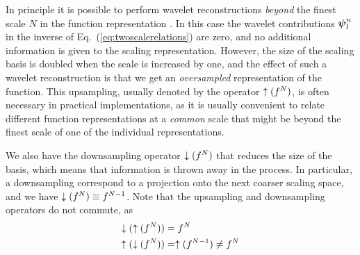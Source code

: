 In principle it is possible to perform wavelet reconstructions \emph{beyond} the
finest scale $N$ in the function representation . In this case
the wavelet contributions $\boldsymbol{\psi}_l^n$ in the inverse of 
Eq.~(\ref{eq:twoscalerelations}) are zero, and no additional information is
given to the scaling representation. However, the size of the scaling basis is 
doubled when the scale is increased by one, and the effect of such a wavelet 
reconstruction is that we get an \emph{oversampled} representation of the 
function. This upsampling, usually denoted by the operator 
$\uparrow({f}^{N})$, is often necessary in practical implementations, 
as it is usually convenient to relate different function representations at a 
\emph{common} scale that might be beyond the finest scale of one of the individual 
representations.

We also have the downsampling operator $\downarrow({f}^{N})$ that reduces
the size of the basis, which means that information is thrown away in the process.
In particular, a downsampling correspond to a projection onto the next coarser
scaling space, and we have $\downarrow({f}^{N}) \equiv {f}^{N-1}$.
Note that the upsampling and downsampling operators do not commute, as
\begin{align}
    \downarrow(\uparrow({f}^{N})) &= {f}^{N}\\ 
    \uparrow(\downarrow({f}^{N})) &= \uparrow({f}^{N-1}) 
	\neq {f}^{N}
\end{align}

